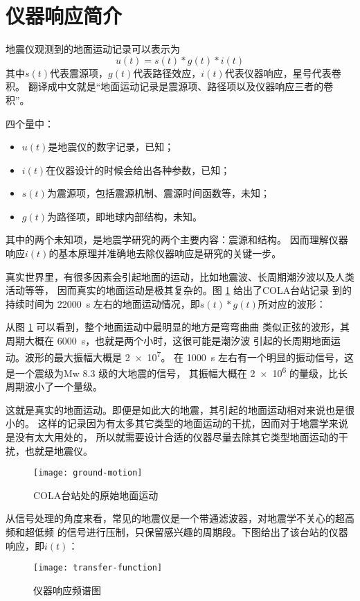\section{仪器响应简介}
地震仪观测到的地面运动记录可以表示为
\[  u(t) = s(t) * g(t) * i(t) \]
其中$s(t)$代表震源项，$g(t)$代表路径效应，$i(t)$代表仪器响应，星号代表卷积。
翻译成中文就是``地面运动记录是震源项、路径项以及仪器响应三者的卷积''。

四个量中：
\begin{itemize}
\item $u(t)$是地震仪的数字记录，已知；
\item $i(t)$在仪器设计的时候会给出各种参数，已知；
\item $s(t)$为震源项，包括震源机制、震源时间函数等，未知；
\item $g(t)$为路径项，即地球内部结构，未知。
\end{itemize}
其中的两个未知项，是地震学研究的两个主要内容：震源和结构。
因而理解仪器响应$i(t)$的基本原理并准确地去除仪器响应是研究的关键一步。

真实世界里，有很多因素会引起地面的运动，比如地震波、长周期潮汐波以及人类活动等等，
因而真实的地面运动是极其复杂的。图 \ref{fig:ground-motion} 给出了COLA台站记录
到的持续时间为 \SI{22000}{\s} 左右的地面运动情况，即$s(t)*g(t)$所对应的波形：

从图 \ref{fig:ground-motion} 可以看到，整个地面运动中最明显的地方是弯弯曲曲
类似正弦的波形，其周期大概在 \SI{6000}{\s}，也就是两个小时，这很可能是潮汐波
引起的长周期地面运动。波形的最大振幅大概是 \num{2e7}。
在 \SI{1000}{\s} 左右有一个明显的振动信号，这是一个震级为Mw \num{8.3} 级的大地震的信号，
其振幅大概在 \num{2e6} 的量级，比长周期波小了一个量级。

这就是真实的地面运动。即便是如此大的地震，其引起的地面运动相对来说也是很小的。
这样的记录因为有太多其它类型的地面运动的干扰，因而对于地震学来说是没有太大用处的，
所以就需要设计合适的仪器尽量去除其它类型地面运动的干扰，也就是地震仪。

\begin{figure}[H]
\centering
\texttt{[image: ground-motion]}
\caption{COLA台站处的原始地面运动}
\label{fig:ground-motion}
\end{figure}

从信号处理的角度来看，常见的地震仪是一个带通滤波器，对地震学不关心的超高频和超低频
的信号进行压制，只保留感兴趣的周期段。下图给出了该台站的仪器响应，即$i(t)$：

\begin{figure}[H]
\centering
\texttt{[image: transfer-function]}
\caption{仪器响应频谱图}
\label{fig:transfer-function}
\end{figure}

